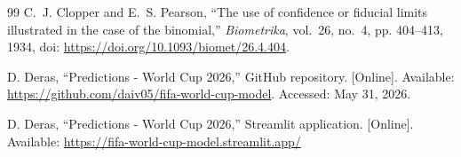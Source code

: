 \documentclass[conference]{IEEEtran}
\begin{document}
\begin{thebibliography}{99}
  C.~J. Clopper and E.~S. Pearson, ``The use of confidence or fiducial limits
  illustrated in the case of the binomial,'' \emph{Biometrika}, vol.~26, no.~4,
  pp. 404--413, 1934, doi: \url{https://doi.org/10.1093/biomet/26.4.404}.

  D. Deras,
  ``Predictions - World Cup 2026,''
  GitHub repository. [Online]. Available:
  \url{https://github.com/daiv05/fifa-world-cup-model}.
  Accessed: May 31, 2026.

  D. Deras,
  ``Predictions - World Cup 2026,''
  Streamlit application. [Online]. Available:
  \url{https://fifa-world-cup-model.streamlit.app/}

\end{thebibliography}
\end{document}
